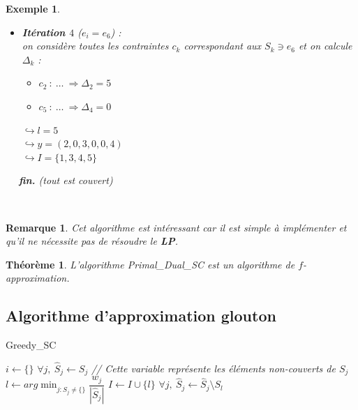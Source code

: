 \documentclass{article}
\newcommand{\titre}[1]{\textcolor{title}{#1}}
\newtheorem{exemple}{Exemple}[section]
\newtheorem{rem}{Remarque}[section]
\newtheorem{thm}{Th\'eor\`eme}[section]
\begin{document}
\begin{sffamily}
\begin{exemple}
\begin{itemize}
	$\hookrightarrow I = \{1,3,4\}$ \\
\item \textbf{Itération $4$} ($e_i = e_6$) :\\
on considère toutes les contraintes $c_k$ correspondant aux $S_k \ni e_6$ et on calcule $\Delta_k$ :
	\begin{itemize}
	\item $c_2\ :\ \ldots\ \Rightarrow \Delta_2 = 5$
	\item $c_5\ :\ \ldots\ \Rightarrow \Delta_4 = 0$
	\end{itemize}
	$\hookrightarrow l = 5$\\
	$\hookrightarrow y = (2,0,3,0,0,4)$\\
	$\hookrightarrow I = \{1,3,4,5\}$
\end{itemize}
\indent$\quad$ \textbf{fin.} \textit{(tout est couvert)}
\end{exemple}
$ $\\

\begin{rem}
Cet algorithme est intéressant car il est simple à implémenter et qu'il ne nécessite pas de résoudre le \titre{\textbf{LP}}.
\end{rem}

\begin{thm} L'algorithme Primal\_Dual\_SC est un algorithme de $f$-approximation. \end{thm}

\subsection{Algorithme d'approximation glouton}

\begin{algorithm}[h!]
\caption{Greedy\_SC}
\begin{algorithmic}[1]
\STATE $i\leftarrow \{\}$
\STATE $\forall j,\ \hat{S}_j \leftarrow S_j$ \textit{// Cette variable représente les éléments non-couverts de $S_j$}
\STATE $l\leftarrow arg\min_{j:\hat{S}_j \neq \{\}} \dfrac{w_j}{|\hat{S}_j|}$
\STATE $I \leftarrow I\cup \{l\}$
\STATE $\forall j,\ \hat{S}_j \leftarrow \hat{S}_j \setminus S_l$
\ENDWHILE
\end{algorithmic}
\end{algorithm}


\end{sffamily}
\end{document}
